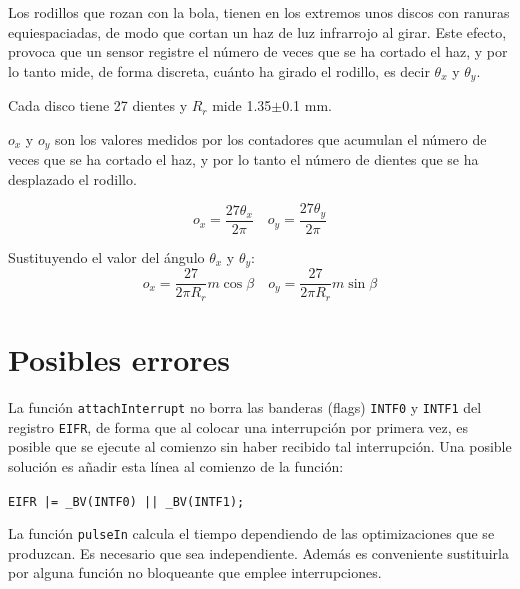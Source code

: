 \documentclass[10pt,a4paper,hidelinks]{article}
\begin{document}
\begin{multicols}{2}
Los rodillos que rozan con la bola, tienen en los extremos unos discos con
ranuras equiespaciadas, de modo que cortan un haz de luz infrarrojo al girar.  
Este efecto, provoca que un sensor registre el número de veces que se ha cortado 
el haz, y por lo tanto mide, de forma discreta, cuánto ha girado el rodillo, es 
decir $\theta_x$ y $\theta_y$.

Cada disco tiene 27 dientes y $R_r$ mide 1.35$\pm$0.1 mm.

$o_x$ y $o_y$ son los valores medidos por los contadores que acumulan el número 
de veces que se ha cortado el haz, y por lo tanto el número de dientes que se ha 
desplazado el rodillo.

$$o_x = \frac{27 \theta_x}{2\pi} \quad o_y = \frac{27 \theta_y}{2\pi}$$

Sustituyendo el valor del ángulo $\theta_x$ y $\theta_y$:
$$ o_x = \frac{27}{2 \pi R_r} m \cos \beta \quad
	o_y = \frac{27}{2 \pi R_r} m \sin \beta $$


\section{Posibles errores}

La función \texttt{attachInterrupt} no borra las banderas (flags) \texttt{INTF0} 
y \texttt{INTF1} del registro \texttt{EIFR}, de forma que al colocar una 
interrupción por primera vez, es posible que se ejecute al comienzo sin haber 
recibido tal interrupción. Una posible solución es añadir esta línea al comienzo 
de la función:

\texttt{EIFR |= \_BV(INTF0) || \_BV(INTF1);}

La función \texttt{pulseIn} calcula el tiempo dependiendo de las optimizaciones
que se produzcan. Es necesario que sea independiente. Además es conveniente
sustituirla por alguna función no bloqueante que emplee interrupciones.



\end{multicols}
\end{document}
